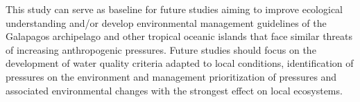 This study can serve as baseline for future studies aiming to improve ecological understanding and/or develop environmental management guidelines of the Galapagos archipelago and other tropical oceanic islands that face similar threats of increasing anthropogenic pressures. Future studies should focus on the development of water quality criteria adapted to local conditions, identification of pressures on the environment and management prioritization of pressures and associated environmental changes with the strongest effect on local ecosystems. 



 


